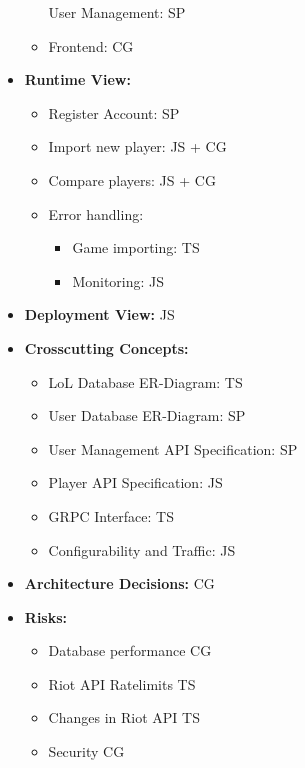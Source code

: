 \begin{itemize}
\begin{itemize}
	User Management: SP
	\item 
	Frontend: CG
\end{itemize}
\item
\textbf{Runtime View:}
\begin{itemize}
	\item
	Register Account: SP
	\item
	Import new player: JS + CG
	\item
	Compare players: JS + CG
	\item
	Error handling:
	\begin{itemize}
		\item
		Game importing: TS
		\item
		Monitoring: JS
	\end{itemize}
\end{itemize}
\item
\textbf{Deployment View:} JS
\item
\textbf{Crosscutting Concepts:}
\begin{itemize}
	\item
	LoL Database ER-Diagram: TS
	\item
	User Database ER-Diagram: SP
	\item
	User Management API Specification: SP
	\item
	Player API Specification: JS
	\item
	GRPC Interface: TS
	\item
	Configurability and Traffic: JS
\end{itemize}
\item
\textbf{Architecture Decisions:} CG
\item
\textbf{Risks:}
\begin{itemize}
	\item
	Database performance CG
	\item
	Riot API Ratelimits TS
	\item
	Changes in Riot API TS
	\item
	Security CG
\end{itemize}
\end{itemize}